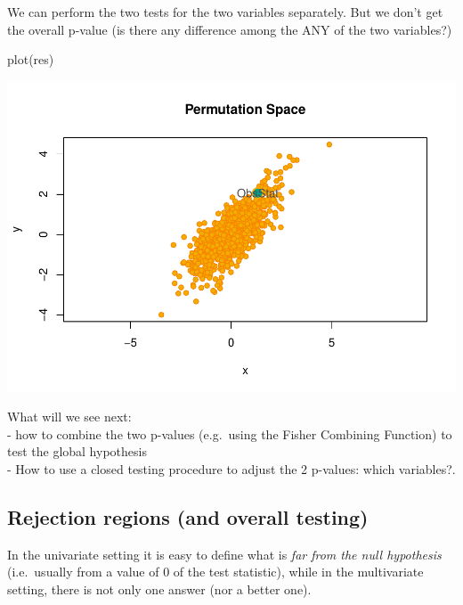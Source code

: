 \documentclass[
]{article}
\newenvironment{Shaded}{\begin{snugshade}}{\end{snugshade}}
\newcommand{\FunctionTok}[1]{\textcolor[rgb]{0.00,0.00,0.00}{#1}}
\newcommand{\NormalTok}[1]{#1}
\begin{document}
We can perform the two tests for the two variables separately. But we
don't get the overall p-value (is there any difference among the ANY of
the two variables?)

\begin{Shaded}
\begin{Highlighting}[]
\FunctionTok{plot}\NormalTok{(res)}
\end{Highlighting}
\end{Shaded}

\begin{center}\includegraphics{perm_files/figure-latex/unnamed-chunk-37-1} \end{center}

What will we see next:\\
- how to combine the two p-values (e.g.~using the Fisher Combining
Function) to test the global hypothesis\\
- How to use a closed testing procedure to adjust the 2 p-values: which
variables?.

\hypertarget{rejection-regions-and-overall-testing}{%
\subsection{Rejection regions (and overall
testing)}\label{rejection-regions-and-overall-testing}}

In the univariate setting it is easy to define what is \emph{far from
the null hypothesis} (i.e.~usually from a value of 0 of the test
statistic), while in the multivariate setting, there is not only one
answer (nor a better one).
\end{document}
